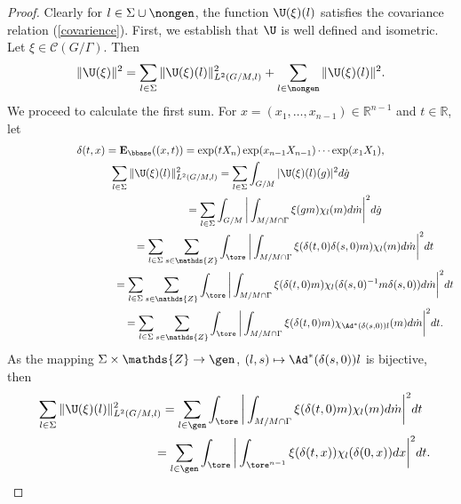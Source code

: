 \begin{proof} Clearly
for $ l \in \Sigma\cup \nongen$, the function $ \U(\xi)(l)$
satisf\/ies the covariance relation (\ref{covarience}). First, we
establish that $\U$ is well def\/ined and isometric. Let $\xi\in
\mathcal{C}(G/\Gamma)$. Then
\begin{gather*}
  \|\U(\xi)\|^2  = \sum_{l \in \Sigma}\|\U(\xi)(l)\|^2_{L^2(G/M, l)} + \sum_{l\in
  \nongen}
    \|\U(\xi)(l)\|^2.
\end{gather*}
We proceed to calculate the f\/irst sum. For $x=(x_1,\ldots, x_{n-1})
\in \mathds{R}^{n-1}$ and $ t\in \mathds{R}$, let
\begin{gather*}
\delta(t, x) = \mathbf{E}_{\bbase}((x, t))= \exp(t X_n) \exp(x_{n-1} X_{n-1})\cdots \exp(x_1
X_1),
\\
\sum_{l\in \Sigma} \|\U(\xi)(l)\|^2_{L^2(G/M, l)}
   = \sum_{l\in \Sigma} \int_{G/M} | \U(\xi)(l)(g)|^2     d\dot{g }\\
 \hphantom{\sum_{l\in \Sigma} \|\U(\xi)(l)\|^2_{L^2(G/M, l)}} {}
  =  \sum_{l\in \Sigma} \int_{G/M} \bigg| \int_{M/M\cap \Gamma}
\xi(gm) \chi_l(m) d\dot{m}\bigg|^2     d\dot{g}\\
\hphantom{\sum_{l\in \Sigma} \|\U(\xi)(l)\|^2_{L^2(G/M, l)}} {} = \sum_{l\in \Sigma} \sum_{s\in \mathds{Z}} \int_{\tore} \bigg|
\int_{M/M\cap \Gamma} \xi(\delta(t, 0)\delta(s, 0)  m) \chi_l (m)
 d\dot{m} \bigg|^2  dt \\
\hphantom{\sum_{l\in \Sigma} \|\U(\xi)(l)\|^2_{L^2(G/M, l)}} {} =
\sum_{l\in \Sigma} \sum_{s\in \mathds{Z}} \int_{\tore} \bigg|
\int_{M/M\cap \Gamma} \xi(\delta(t, 0)  m) \chi_l ( \delta(s,
0)^{-1} m \delta(s, 0))
 d\dot{m} \bigg|^2  dt\\
\hphantom{\sum_{l\in \Sigma} \|\U(\xi)(l)\|^2_{L^2(G/M, l)}} {}  =  \sum_{l\in \Sigma} \sum_{s\in
\mathds{Z}} \int_{\tore}  \bigg| \int_{M/M\cap \Gamma} \xi(\delta(t, 0)
m) \chi_{\Ad^*(\delta(s, 0))l} (m)
 d\dot{m} \bigg|^2  dt .
\end{gather*}
As the mapping $\Sigma\times \mathds{Z}\rightarrow \gen$, $(l, s) \mapsto \Ad^*(\delta(s, 0))l$
 is bijective, then
 \begin{gather*}
 \sum_{l\in \Sigma} \|\U(\xi)(l)\|^2_{L^2(G/M, l)}
   =  \sum_{l\in \gen}  \int_{\tore}  \bigg| \int_{M/M\cap
\Gamma} \xi(\delta(t, 0) m) \chi_l (m)
 d\dot{m} \bigg|^2  dt  \\
 \hphantom{\sum_{l\in \Sigma} \|\U(\xi)(l)\|^2_{L^2(G/M, l)}}{}
  =  \sum_{l\in \gen}  \int_{\tore}
 \bigg|
 \int_{\tore^{n-1}} \xi(\delta(t, x))
  \chi_l (\delta(0, x))
 dx  \bigg|^2  dt.

\end{gather*}
\end{proof}
